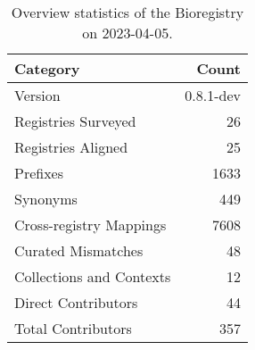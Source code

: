 \begin{table}
\caption{Overview statistics of the Bioregistry on 2023-04-05.}
\label{tab:bioregistry-summary}
\begin{tabular}{lr}
\toprule
Category & Count \\
\midrule
Version & 0.8.1-dev \\
Registries Surveyed & 26 \\
Registries Aligned & 25 \\
Prefixes & 1633 \\
Synonyms & 449 \\
Cross-registry Mappings & 7608 \\
Curated Mismatches & 48 \\
Collections and Contexts & 12 \\
Direct Contributors & 44 \\
Total Contributors & 357 \\
\bottomrule
\end{tabular}
\end{table}
